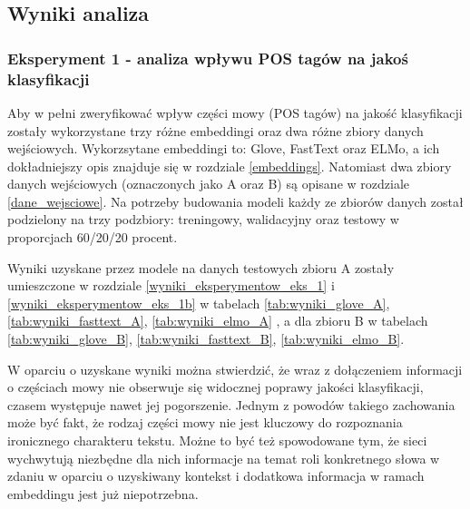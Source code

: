 

\subsection{Wyniki analiza}

\subsubsection{Eksperyment 1 - analiza wpływu POS tagów na jakoś klasyfikacji}

Aby w pełni zweryfikować wpływ części mowy (POS tagów) na jakość klasyfikacji zostały wykorzystane trzy różne embeddingi oraz dwa różne zbiory danych wejściowych. Wykorzsytane embeddingi to: Glove, FastText oraz ELMo, a ich dokładniejszy opis znajduje się w rozdziale \ref{embeddings}. Natomiast dwa zbiory danych wejściowych (oznaczonych jako A oraz B) są opisane w rozdziale \ref{dane_wejsciowe}. Na potrzeby budowania modeli każdy ze zbiorów danych został podzielony na trzy podzbiory: treningowy, walidacyjny oraz testowy w proporcjach 60/20/20 procent.

Wyniki uzyskane przez modele na danych testowych zbioru A zostały umieszczone w rozdziale \ref{wyniki_eksperymentow_eks_1} i \ref{wyniki_eksperymentow_eks_1b} w tabelach \ref{tab:wyniki_glove_A}, \ref{tab:wyniki_fasttext_A}, \ref{tab:wyniki_elmo_A} , a dla zbioru B w tabelach \ref{tab:wyniki_glove_B}, \ref{tab:wyniki_fasttext_B}, \ref{tab:wyniki_elmo_B}.


W oparciu o uzyskane wyniki można stwierdzić, że wraz z dołączeniem informacji o częściach mowy nie obserwuje się widocznej poprawy jakości klasyfikacji, czasem występuje nawet jej pogorszenie. Jednym z powodów takiego zachowania może być fakt, że rodzaj części mowy nie jest kluczowy do rozpoznania ironicznego charakteru tekstu. Możne to być też spowodowane tym, że sieci wychwytują niezbędne dla nich informacje na temat roli konkretnego słowa w zdaniu w oparciu o uzyskiwany kontekst i dodatkowa informacja w ramach embeddingu jest już niepotrzebna.

